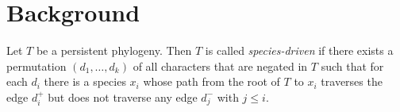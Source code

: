 \section{Background}




\begin{definition}
\label{definition:species-driven}
Let $T$ be a persistent phylogeny.
Then $T$ is called \emph{species-driven} if there exists a permutation
$(d_{1}, \ldots , d_{k})$ of all characters that are negated in $T$
such that for each $d_{i}$ there is a species $x_{i}$ whose path from
the root of $T$ to $x_{i}$ traverses the edge $d_{i}^{+}$ but does not
traverse any edge $d_{j}^{-}$ with $j \le i$.
\end{definition}


